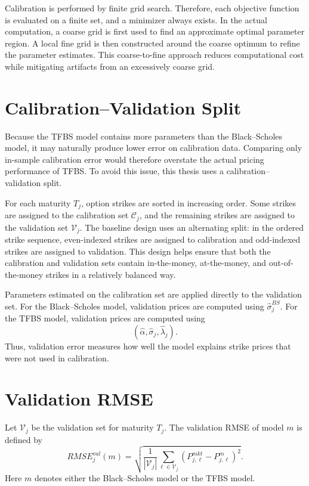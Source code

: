 \documentclass[11pt,a4paper]{report}
\begin{document}
Calibration is performed by finite grid search. Therefore, each objective function is evaluated on a finite set, and a minimizer always exists. In the actual computation, a coarse grid is first used to find an approximate optimal parameter region. A local fine grid is then constructed around the coarse optimum to refine the parameter estimates. This coarse-to-fine approach reduces computational cost while mitigating artifacts from an excessively coarse grid.

\section{Calibration--Validation Split}

Because the TFBS model contains more parameters than the Black--Scholes model, it may naturally produce lower error on calibration data. Comparing only in-sample calibration error would therefore overstate the actual pricing performance of TFBS. To avoid this issue, this thesis uses a calibration--validation split.

For each maturity $T_j$, option strikes are sorted in increasing order. Some strikes are assigned to the calibration set $\mathcal{C}_j$, and the remaining strikes are assigned to the validation set $\mathcal{V}_j$. The baseline design uses an alternating split: in the ordered strike sequence, even-indexed strikes are assigned to calibration and odd-indexed strikes are assigned to validation. This design helps ensure that both the calibration and validation sets contain in-the-money, at-the-money, and out-of-the-money strikes in a relatively balanced way.

Parameters estimated on the calibration set are applied directly to the validation set. For the Black--Scholes model, validation prices are computed using $\widehat{\sigma}_j^{BS}$. For the TFBS model, validation prices are computed using
\[
(\widehat{\alpha},\widehat{\sigma}_j,\widehat{\lambda}_j).
\]
Thus, validation error measures how well the model explains strike prices that were not used in calibration.

\section{Validation RMSE}

Let $\mathcal{V}_j$ be the validation set for maturity $T_j$. The validation RMSE of model $m$ is defined by
\[
RMSE_{j}^{val}(m)
=
\sqrt{
\frac{1}{|\mathcal{V}_j|}
\sum_{\ell\in\mathcal{V}_j}
\left(
P_{j,\ell}^{mkt}
-
P_{j,\ell}^{m}
\right)^2
}.
\]
Here $m$ denotes either the Black--Scholes model or the TFBS model.
\end{document}
